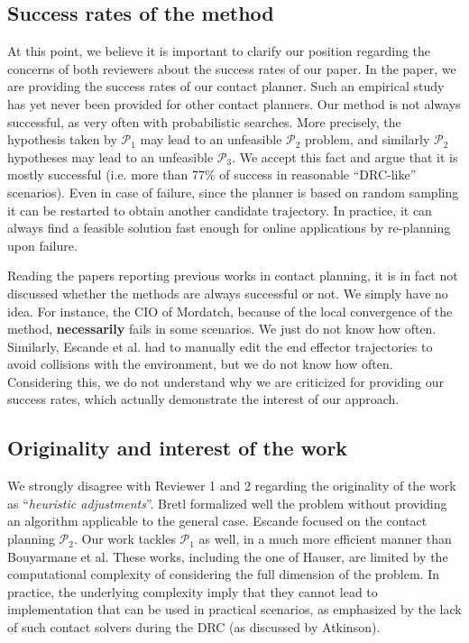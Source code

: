 \documentclass[a4paper]{article}
\begin{document}
\newcommand{\mP}[1]{$\mathcal{P}_#1$}

\subsection{Success rates of the method}
At this point, we believe it is important to clarify our position regarding the concerns of both reviewers about the success rates of our paper.
In the paper, we are providing the success rates of our contact planner. 
Such an empirical study has yet never been provided for other contact planners.
Our method is not always successful, as very often with probabilistic searches.
More precisely, the hypothesis taken by \mP1 may lead to an unfeasible \mP2 problem, and similarly \mP2 hypotheses may lead to an unfeasible \mP3.
We accept this fact and argue that it is mostly successful (i.e. more than 77\% of success in reasonable ``DRC-like'' scenarios).
Even in case of failure, since the planner is based on random sampling it can be restarted to obtain another candidate trajectory.
In practice, it can always find a feasible solution fast enough for online applications by re-planning upon failure.

Reading the papers reporting previous works in contact planning, it is in fact not discussed whether the methods are always successful or not. We simply have no idea. For instance, the CIO of Mordatch,
because of the local convergence of the method, \textbf{necessarily} fails in some scenarios. We just do not know how often. Similarly, Escande et al. had to manually edit 
the end effector trajectories to avoid collisions with the environment, but we do not know how often. Considering this,
we do not understand why we are criticized for providing our success rates, which actually demonstrate the interest of our approach.

\subsection{Originality and interest of the work}
\label{orig}
We strongly disagree with Reviewer 1 and 2 regarding the originality of the work as ``\textit{heuristic adjustments}''.
Bretl formalized well the problem without providing an algorithm applicable to the general case. Escande focused on the contact planning $\mathcal{P}_2$. 
Our work tackles $\mathcal{P}_1$ as well, in a much more efficient manner than Bouyarmane et al.
These works, including the one of Hauser, are limited by the computational complexity of considering the full dimension of the problem.
In practice, the underlying complexity imply that they cannot lead to implementation that can be used in practical scenarios, as emphasized by the lack of such contact solvers during the DRC (as discussed by Atkinson).
\end{document}
